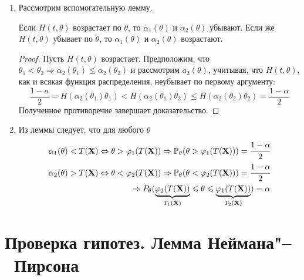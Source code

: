 \begin{enumerate}
    \item Рассмотрим вспомогательную лемму.
    \begin{lem}
        Если $H(t, \theta)$ возрастает по $\theta$, то $\alpha_{1}(\theta)$ и $\alpha_{2}(\theta)$ убывают. Если же $H(t, \theta)$ убывает по $\theta$, то $\alpha_{1}(\theta)$ и $\alpha_{2}(\theta)$ возрастают.
    \end{lem}
    \begin{proof}
        Пусть $H(t, \theta)$ возрастает. Предположим, что $\theta_{1}<\theta_{2} \Rightarrow \alpha_{2}\left(\theta_{1}\right) \leqslant \alpha_{2}\left(\theta_{2}\right)$ и рассмотрим $a_{2}(\theta)$, учитывая, что $H(t, \theta)$, как и всякая функция распределения, неубывает по первому аргументу:
        \begin{equation*}
            \frac{1-a}{2} 
            = H\left(\alpha_{2}\left(\theta_{1}\right) \theta_{1}\right)
            < H\left(\alpha_{2}\left(\theta_{1}\right) \theta_{2}\right) 
            \leqslant H\left(\alpha_{2}\left(\theta_{2}\right) \theta_{2}\right)
            = \frac{1-\alpha}{2}
        \end{equation*}
        Полученное противоречие завершает доказательство.
    \end{proof}
    \item Из леммы следует, что для любого $\theta$
    \begin{equation*}
    \begin{aligned}
        \alpha_{1}(\theta) 
        < T(\mathbf{X})
        \Leftrightarrow \theta>\varphi_{1}(T(\mathbf{X}))
        \Rightarrow \mathbb{P}_{\theta}(\theta>\varphi_{1}(T(\mathbf{X})))
        = \cfrac{1-\alpha}{2} \\
        \alpha_{2}(\theta)>T(\mathbf{X}) 
        \Leftrightarrow \theta<\varphi_{2}(T(\mathbf{X})) \Rightarrow \mathbb{P}_{\theta}(\theta<\varphi_{2}(T(\mathbf{X})))
        = \cfrac{1-\alpha}{2} \\
        \Rightarrow P_{\theta}(\underbrace{\varphi_{2}(T(\mathbf{X}))}_{T_{1}(\mathbf{X})} 
        \leqslant \theta 
        \leqslant \underbrace{\varphi_{1}(T(\mathbf{X}))}_{T_{2}(\mathbf{X})})
        = \alpha
    \end{aligned}
    \end{equation*}

\end{enumerate}

\section{Проверка гипотез. Лемма Неймана"--~Пирсона}

